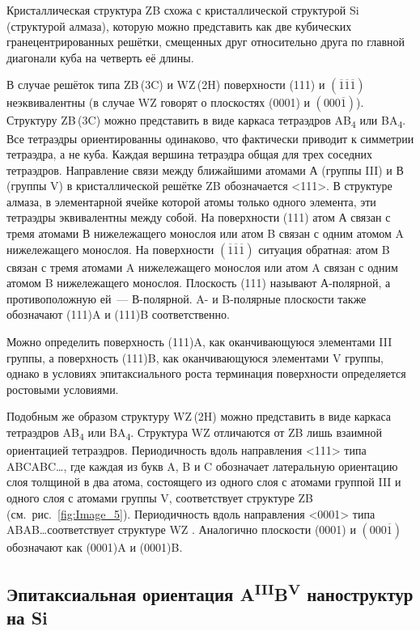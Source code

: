 Кристаллическая структура ZB схожа с кристаллической структурой Si (структурой алмаза), которую можно представить как две кубических гранецентрированных решётки, смещенных друг относительно друга по главной диагонали куба на четверть её длины.

В случае решёток типа ZB\,(3C) и WZ\,(2H) поверхности (111) и \((\overline{1}\overline{1}\overline{1})\) неэквивалентны (в случае WZ говорят о плоскостях (0001) и \((000\overline{1})\)). Структуру ZB\,(3C) можно представить в виде каркаса тетраэдров AB\textsubscript{4} или BA\textsubscript{4}. Все тетраэдры ориентированны одинаково, что фактически приводит к симметрии тетраэдра, а не куба. Каждая вершина тетраэдра общая для трех соседних тетраэдров. Направление связи между ближайшими атомами А (группы III) и В (группы V) в кристаллической решётке ZB обозначается <111>. В структуре алмаза, в элементарной ячейке которой атомы только одного элемента, эти тетраэдры эквивалентны между собой. На поверхности (111) атом А связан с тремя атомами В нижележащего монослоя или атом B связан с одним атомом A нижележащего монослоя. На поверхности \((\overline{1}\overline{1}\overline{1})\) ситуация обратная: атом B связан с тремя атомами A нижележащего монослоя или атом A связан с одним атомом B нижележащего монослоя. Плоскость (111) называют А-полярной, а противоположную ей~--- В-полярной. A- и B-полярные плоскости также обозначают (111)A и (111)B соответственно.

Можно определить поверхность (111)A, как оканчивающуюся элементами III группы, а поверхность (111)B, как оканчивающуюся элементами V группы, однако в условиях эпитаксиального роста терминация поверхности определяется ростовыми условиями.

Подобным же образом структуру WZ\,(2H) можно представить в виде каркаса тетраэдров AB\textsubscript{4} или BA\textsubscript{4}. Структура WZ отличаются от ZB лишь взаимной ориентацией тетраэдров. Периодичность вдоль направления <111> типа ABCABC\dots, где каждая из букв A, B и C обозначает латеральную ориентацию слоя толщиной в два атома, состоящего из одного слоя с атомами группой III и одного слоя с атомами группы V, соответствует структуре ZB (см.~рис.~\cref{fig:Image_5}). Периодичность вдоль направления <0001> типа ABAB\dots соответствует структуре WZ \cite{Kriegner2011}. Аналогично плоскости (0001) и \((000\overline{1})\) обозначают как (0001)A и (0001)B.

\subsection{Эпитаксиальная ориентация A\textsuperscript{III}B\textsuperscript{V} наноструктур на Si}\label{subsec:ch1/sec2/sub4}

